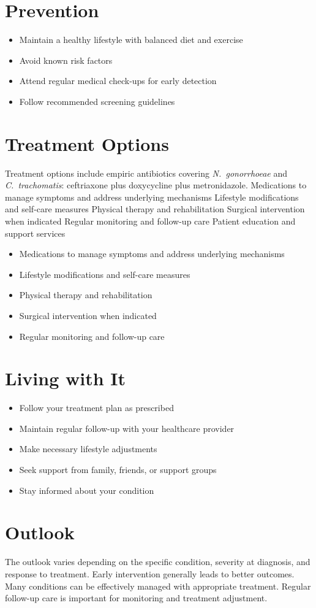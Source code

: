 \section{Prevention}
\begin{itemize}[noitemsep]
  \item Maintain a healthy lifestyle with balanced diet and exercise
  \item Avoid known risk factors
  \item Attend regular medical check-ups for early detection
  \item Follow recommended screening guidelines
\end{itemize}
\section{Treatment Options}
Treatment options include empiric antibiotics covering \textit{N.~gonorrhoeae} and \textit{C.~trachomatis}: ceftriaxone plus doxycycline plus metronidazole. Medications to manage symptoms and address underlying mechanisms Lifestyle modifications and self-care measures Physical therapy and rehabilitation Surgical intervention when indicated Regular monitoring and follow-up care Patient education and support services

\begin{itemize}[noitemsep]
  \item Medications to manage symptoms and address underlying mechanisms
  \item Lifestyle modifications and self-care measures
  \item Physical therapy and rehabilitation
  \item Surgical intervention when indicated
  \item Regular monitoring and follow-up care
\end{itemize}
\section{Living with It}
\begin{itemize}[noitemsep]
  \item Follow your treatment plan as prescribed
  \item Maintain regular follow-up with your healthcare provider
  \item Make necessary lifestyle adjustments
  \item Seek support from family, friends, or support groups
  \item Stay informed about your condition
\end{itemize}
\section{Outlook}
The outlook varies depending on the specific condition, severity at diagnosis, and response to treatment. Early intervention generally leads to better outcomes. Many conditions can be effectively managed with appropriate treatment. Regular follow-up care is important for monitoring and treatment adjustment.

